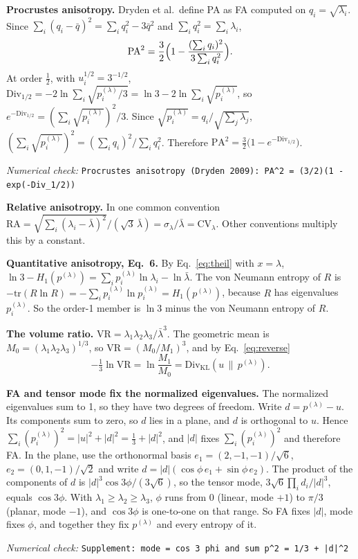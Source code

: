 \documentclass[11pt]{article}
\newcommand{\Div}{\mathrm{Div}}
\newcommand{\KL}{\Div_{\mathrm{KL}}}
\newcommand{\CV}{\mathrm{CV}}
\newcommand{\tr}{\mathrm{tr}}
\newcommand{\numcheck}[1]{\par{\small\raggedright\noindent\textit{Numerical check:} \texttt{#1}\par}}
\begin{document}
\textbf{Procrustes anisotropy.} Dryden et al.\ define PA as FA computed on $q_i = \sqrt{\lambda_i}$. Since
$\sum_i(q_i-\bar q)^2 = \sum_iq_i^2 - 3\bar q^2$ and $\sum_iq_i^2 = \sum_i\lambda_i$,
\begin{equation}
\mathrm{PA}^2 = \frac32\Bigl(1 - \frac{(\sum_iq_i)^2}{3\sum_iq_i^2}\Bigr) .
\end{equation}
At order $\tfrac12$, with $u_i^{1/2} = 3^{-1/2}$,
$\Div_{1/2} = -2\ln\sum_i\sqrt{p^{(\lambda)}_i/3} = \ln3 - 2\ln\sum_i\sqrt{p^{(\lambda)}_i}$, so
$e^{-\Div_{1/2}} = (\sum_i\sqrt{p^{(\lambda)}_i})^2/3$. Since $\sqrt{p^{(\lambda)}_i} = q_i/\sqrt{\sum_j\lambda_j}$,
$(\sum_i\sqrt{p^{(\lambda)}_i})^2 = (\sum_iq_i)^2/\sum_iq_i^2$. Therefore
$\mathrm{PA}^2 = \tfrac32\bigl(1-e^{-\Div_{1/2}}\bigr)$.
\numcheck{Procrustes anisotropy (Dryden 2009): PA\^{}2 = (3/2)(1 - exp(-Div\_1/2))}

\textbf{Relative anisotropy.} In one common convention $\mathrm{RA} = \sqrt{\sum_i(\lambda_i-\bar\lambda)^2}/(\sqrt3\,\bar\lambda)
= \sigma_\lambda/\bar\lambda = \CV_\lambda$. Other conventions multiply this by a constant.

\textbf{Quantitative anisotropy, Eq.~6.} By Eq.~\eqref{eq:theil} with $x=\lambda$,
$\ln3 - H_1(p^{(\lambda)}) = \sum_ip^{(\lambda)}_i\ln\lambda_i - \ln\bar\lambda$. The von Neumann entropy of $R$ is
$-\tr(R\ln R) = -\sum_ip^{(\lambda)}_i\ln p^{(\lambda)}_i = H_1(p^{(\lambda)})$, because $R$ has eigenvalues
$p^{(\lambda)}_i$. So the order-1 member is $\ln3$ minus the von Neumann entropy of $R$.

\textbf{The volume ratio.} $\mathrm{VR} = \lambda_1\lambda_2\lambda_3/\bar\lambda^3$. The geometric mean is
$M_0 = (\lambda_1\lambda_2\lambda_3)^{1/3}$, so $\mathrm{VR} = (M_0/M_1)^3$, and by Eq.~\eqref{eq:reverse}
\begin{equation}
-\tfrac13\ln\mathrm{VR} = \ln\frac{M_1}{M_0} = \KL(u\,\|\,p^{(\lambda)}) .
\end{equation}

\textbf{FA and tensor mode fix the normalized eigenvalues.} The normalized eigenvalues sum to 1, so they have two
degrees of freedom. Write $d = p^{(\lambda)} - u$. Its components sum to zero, so $d$ lies in a plane, and $d$ is
orthogonal to $u$. Hence $\sum_i(p^{(\lambda)}_i)^2 = |u|^2 + |d|^2 = \tfrac13 + |d|^2$, and $|d|$ fixes
$\sum_i(p^{(\lambda)}_i)^2$ and therefore FA. In the plane, use the orthonormal basis
$e_1 = (2,-1,-1)/\sqrt6$, $e_2 = (0,1,-1)/\sqrt2$ and write $d = |d|(\cos\phi\,e_1 + \sin\phi\,e_2)$. The product of
the components of $d$ is $|d|^3\cos3\phi/(3\sqrt6)$, so the tensor mode, $3\sqrt6\prod_id_i/|d|^3$, equals
$\cos3\phi$. With $\lambda_1\ge\lambda_2\ge\lambda_3$, $\phi$ runs from 0 (linear, mode $+1$) to $\pi/3$ (planar, mode
$-1$), and $\cos3\phi$ is one-to-one on that range. So FA fixes $|d|$, mode fixes $\phi$, and together they fix
$p^{(\lambda)}$ and every entropy of it.
\numcheck{Supplement: mode = cos 3 phi and sum p\^{}2 = 1/3 + |d|\^{}2}
\end{document}
